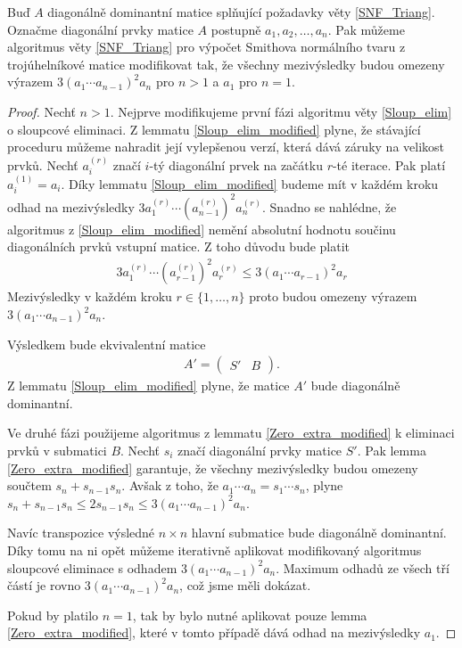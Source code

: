\begin{vet}
Buď $ A $ diagonálně dominantní matice splňující požadavky věty \ref{SNF_Triang}.
Označme diagonální prvky matice $ A $ postupně $ a_1, a_2, \dots, a_n $.
Pak můžeme algoritmus věty \ref{SNF_Triang} pro výpočet Smithova normálního 
tvaru z trojúhelníkové matice modifikovat tak, že všechny mezivýsledky budou 
omezeny výrazem $ 3 (a_1 \cdots a_{n - 1})^2 a_n $ pro $ n > 1 $ a $ a_1 $ 
pro $ n = 1 $.
\end{vet}
\begin{proof}
Nechť $ n > 1 $.
Nejprve modifikujeme první fázi algoritmu věty \ref{Sloup_elim} o sloupcové 
eliminaci. Z lemmatu \ref{Sloup_elim_modified} plyne, že stávající proceduru 
můžeme nahradit její vylepšenou verzí, která dává záruky na velikost prvků. 
Nechť $ a_i^{(r)} $ značí $ i $-tý diagonální prvek na začátku $ r $-té 
iterace. Pak platí $ a_i^{(1)} = a_i $. Díky lemmatu \ref{Sloup_elim_modified}
budeme mít v každém kroku odhad na mezivýsledky 
$ 3 a_1^{(r)} \cdots (a_{n - 1}^{(r)})^2 a_n^{(r)} $.
Snadno se nahlédne, že algoritmus z \ref{Sloup_elim_modified} nemění absolutní 
hodnotu součinu diagonálních prvků vstupní matice. Z toho důvodu bude platit
\begin{align*}
    3 a_1^{(r)} \cdots (a_{r - 1}^{(r)})^2 a_r^{(r)}
        \leq 3 (a_1 \cdots a_{r - 1})^2 a_r
\end{align*}
Mezivýsledky v každém kroku $ r \in \{1, \dots, n \} $ proto budou omezeny 
výrazem $ 3 (a_1 \cdots a_{n - 1})^2 a_n $.

Výsledkem bude ekvivalentní matice
\begin{align*}
A' =
    \left(
    \begin{array}{c|c}
        S' & B
    \end{array}
    \right)
.
\end{align*}
Z lemmatu \ref{Sloup_elim_modified} plyne, že matice $ A' $ bude diagonálně
dominantní.

Ve druhé fázi použijeme algoritmus z lemmatu \ref{Zero_extra_modified}
k eliminaci prvků v submatici $ B $. Nechť $ s_i $ značí diagonální prvky matice 
$ S' $. Pak lemma \ref{Zero_extra_modified} garantuje, že všechny mezivýsledky 
budou omezeny součtem $ s_n + s_{n - 1} s_n $. Avšak z toho, že 
$ a_1 \cdots a_n = s_1 \cdots s_n $, plyne 
$ s_n + s_{n - 1} s_n \leq 2 s_{n - 1} s_n \leq 3 (a_1 \cdots a_{n - 1})^2 a_n $.

Navíc transpozice výsledné $ n \times n $ hlavní submatice bude diagonálně 
dominantní. Díky tomu na ni opět můžeme iterativně aplikovat modifikovaný 
algoritmus sloupcové eliminace s odhadem $ 3 (a_1 \cdots a_{n - 1})^2 a_n $.
Maximum odhadů ze všech tří částí je rovno $ 3 (a_1 \cdots a_{n - 1})^2 a_n $, 
což jsme měli dokázat.

Pokud by platilo $ n = 1 $, tak by bylo nutné aplikovat pouze lemma 
\ref{Zero_extra_modified}, které v tomto případě dává odhad na mezivýsledky
$ a_1 $.
\end{proof}






